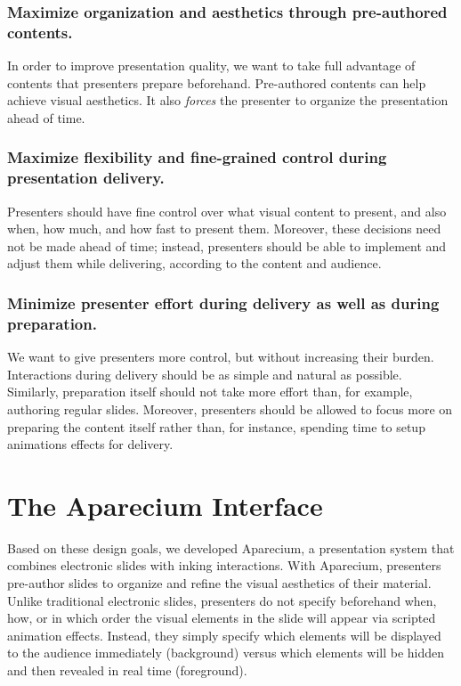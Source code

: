 \subsubsection{Maximize organization and aesthetics through pre-authored contents.} 
In order to improve presentation quality, we want to take full advantage of contents that presenters prepare beforehand. Pre-authored contents can help achieve visual aesthetics. It also \emph{forces} the presenter to organize the presentation ahead of time. 
 
\subsubsection{Maximize flexibility and fine-grained control during presentation delivery.} Presenters should have fine control over what visual content to present, and also when, how much, and how fast to present them. Moreover, these decisions need not be made ahead of time; instead, presenters should be able to implement and adjust them while delivering, according to the content and audience. 

\subsubsection{Minimize presenter effort during delivery as well as during preparation.} 
We want to give presenters more control, but without increasing their burden. Interactions during delivery should be as simple and natural as possible. Similarly, preparation itself should not take more effort than, for example, authoring regular slides. Moreover, presenters should be allowed to focus more on preparing the content itself rather than, for instance, spending time to setup animations effects for delivery. 



\section{The Aparecium Interface}

Based on these design goals, we developed Aparecium, a presentation system that combines electronic slides with inking interactions. With Aparecium, presenters pre-author slides to organize and refine the visual aesthetics of their material. Unlike traditional electronic slides, presenters do not specify beforehand when, how, or in which order the visual elements in the slide will appear via scripted animation effects. Instead, they simply specify which elements will be displayed to the audience immediately (background) versus which elements will be hidden and then revealed in real time (foreground).\\ 

